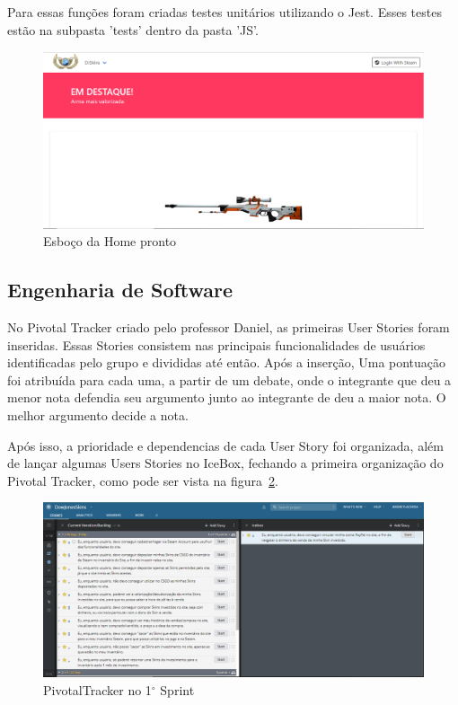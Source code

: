 Para essas funções foram criadas testes unitários utilizando o Jest. Esses testes estão na subpasta 'tests' 
dentro da pasta 'JS'.\\

\begin{figure}[!htb]
	\centering
	\includegraphics[scale=0.5]{Imagens/Home.png}
	\caption{Esboço da Home pronto}
	\label{fig:home}
\end{figure}

\subsection{Engenharia de Software}
No Pivotal Tracker criado pelo professor Daniel, as primeiras User Stories foram inseridas. Essas Stories consistem 
nas principais funcionalidades de usuários identificadas pelo grupo e divididas até então. Após a inserção, 
Uma pontuação foi atribuída para cada uma, a partir de um debate, onde o integrante que deu a menor nota defendia seu argumento 
junto ao integrante de deu a maior nota. O melhor argumento decide a nota.

Após isso, a prioridade e dependencias de cada User Story foi organizada, além de lançar algumas Users Stories no IceBox, fechando a primeira organização do Pivotal Tracker, como pode ser vista na figura~\ref{fig:pivotal}.\\

\begin{figure}[!htb]
	\centering
	\includegraphics[scale=0.4]{Imagens/Pivotal1.png}
	\caption{PivotalTracker no 1$^{\circ}$ Sprint}
	\label{fig:pivotal}
\end{figure}

